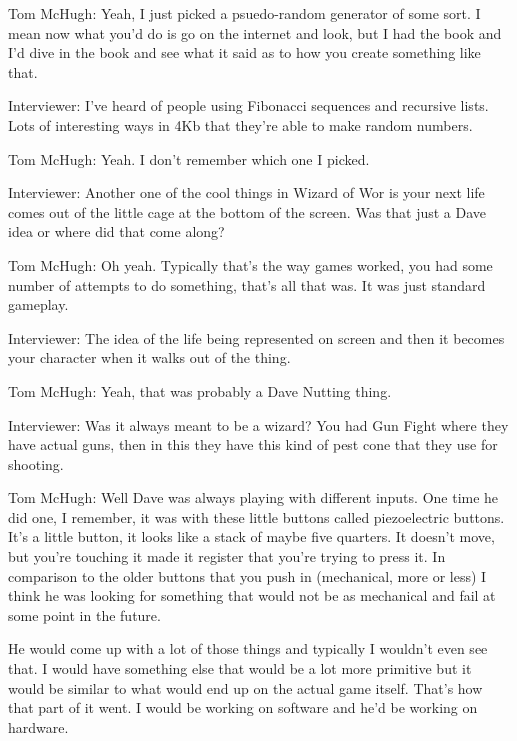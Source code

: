 \textcolor{interviewee}{Tom McHugh:} Yeah, I just picked a psuedo-random generator of some sort. I mean now what you’d do is go on the internet and look, but I had the book and I’d dive in the book and see what it said as to how you create something like that.

\textcolor{interviewer}{Interviewer:} I’ve heard of people using Fibonacci sequences and recursive lists. Lots of interesting ways in 4Kb that they’re able to make random numbers.

\textcolor{interviewee}{Tom McHugh:} Yeah. I don’t remember which one I picked.

\textcolor{interviewer}{Interviewer:} Another one of the cool things in Wizard of Wor is your next life comes out of the little cage at the bottom of the screen. Was that just a Dave idea or where did that come along?

\textcolor{interviewee}{Tom McHugh:} Oh yeah. Typically that’s the way games worked, you had some number of attempts to do something, that’s all that was. It was just standard gameplay.

\textcolor{interviewer}{Interviewer:} The idea of the life being represented on screen and then it becomes your character when it walks out of the thing.

\textcolor{interviewee}{Tom McHugh:} Yeah, that was probably a Dave Nutting thing.

\textcolor{interviewer}{Interviewer:} Was it always meant to be a wizard? You had Gun Fight where they have actual guns, then in this they have this kind of pest cone that they use for shooting.

\textcolor{interviewee}{Tom McHugh:} Well Dave was always playing with different inputs. One time he did one, I remember, it was with these little buttons called piezoelectric buttons. It’s a little button, it looks like a stack of maybe five quarters. It doesn’t move, but you’re touching it made it register that you’re trying to press it. In comparison to the older buttons that you push in (mechanical, more or less) I think he was looking for something that would not be as mechanical and fail at some point in the future.

He would come up with a lot of those things and typically I wouldn’t even see that. I would have something else that would be a lot more primitive but it would be similar to what would end up on the actual game itself. That’s how that part of it went. I would be working on software and he’d be working on hardware. 

